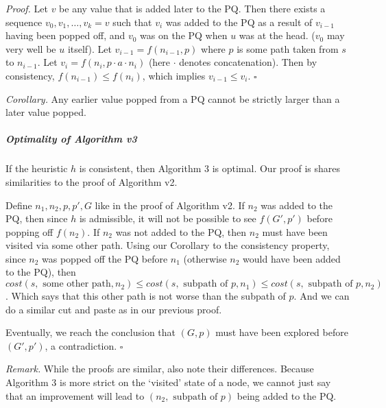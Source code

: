 \documentclass[a4paper]{article}
\begin{document}
\textit{Proof.} Let $v$ be any value that is added later to the PQ. Then there exists a sequence $v_0, v_1, \dots, v_k = v$ such that $v_i$ was added to the PQ as a result of $v_{i-1}$ having been popped off, and $v_0$ was on the PQ when $u$ was at the head. ($v_0$ may very well be $u$ itself). Let $v_{i-1} = f(n_{i-1}, p)$ where $p$ is some path taken from $s$ to $n_{i-1}$. Let $v_{i} = f(n_i, p\cdot a\cdot n_i)$ (here $\cdot$ denotes concatenation). Then by consistency, $f(n_{i - 1})\leq f(n_i)$, which implies $v_{i-1}\leq v_i$. $\square$

\textit{Corollary.} Any earlier value popped from a PQ cannot be strictly larger than a later value popped.

\subparagraph{Optimality of Algorithm v3} If the heuristic $h$ is consistent, then Algorithm 3 is optimal. Our proof is shares similarities to the proof of Algorithm v2. 

Define $n_1, n_2, p, p', G$ like in the proof of Algorithm v2. If $n_2$ was added to the PQ, then since $h$ is admissible, it will not be possible to see $f(G', p')$ before popping off $f(n_2)$. If $n_2$ was not added to the PQ, then $n_2$ must have been visited via some other path. Using our Corollary to the consistency property, since $n_2$ was popped off the PQ before $n_1$ (otherwise $n_2$ would have been added to the PQ), then $cost(s, \text{ some other path}, n_2) \leq cost(s, \text{ subpath of }p, n_1) \leq cost(s, \text{ subpath of }p, n_2)$. Which says that this other path is not worse than the subpath of $p$. And we can do a similar cut and paste as in our previous proof.

Eventually, we reach the conclusion that $(G, p)$ must have been explored before $(G', p')$, a contradiction. $\square$

\textit{Remark.} While the proofs are similar, also note their differences. Because Algorithm 3 is more strict on the `visited' state of a node, we cannot just say that an improvement will lead to $(n_2, \text{ subpath of }p)$ being added to the PQ. 
\end{document}
